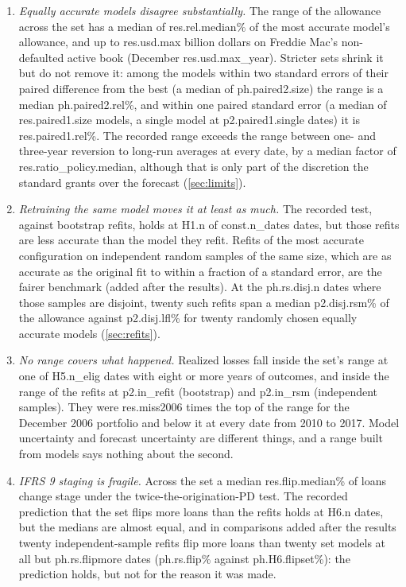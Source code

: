 \begin{enumerate}[leftmargin=*, itemsep=2pt]
\item \emph{Equally accurate models disagree substantially.} The range of the
allowance across the set has a median of \num{res.rel.median}\% of the most
accurate model's allowance, and up to \num{res.usd.max} billion dollars on
Freddie Mac's non-defaulted active book (December \num{res.usd.max_year}).
Stricter sets shrink it but do not remove it: among the models within two
standard errors of their paired difference from the best (a median of
\num{ph.paired2.size}) the range is a median \num{ph.paired2.rel}\%, and within
one paired standard error (a median of \num{res.paired1.size} models, a single
model at \num{p2.paired1.single} dates) it is \num{res.paired1.rel}\%. The
recorded range exceeds the range between one- and three-year reversion to
long-run averages at every date, by a median factor of
\num{res.ratio_policy.median}, although that is only part of the discretion
the standard grants over the forecast (\cref{sec:limits}).
\item \emph{Retraining the same model moves it at least as much.} The recorded
test, against bootstrap refits, holds at \num{H1.n} of \num{const.n_dates}
dates, but those refits are less accurate than the model they refit. Refits of
the most accurate configuration on independent random samples of the same
size, which are as accurate as the original fit to within a fraction of a
standard error, are the fairer benchmark (added after the results). At the
\num{ph.rs.disj.n} dates where those samples are disjoint, twenty such refits
span a median \num{p2.disj.rsm}\% of the allowance against \num{p2.disj.lfl}\%
for twenty randomly chosen equally accurate models (\cref{sec:refits}).
\item \emph{No range covers what happened.} Realized losses fall inside
the set's range at one of \num{H5.n_elig} dates with eight or more years of
outcomes, and inside the range of the refits at \num{p2.in_refit} (bootstrap)
and \num{p2.in_rsm} (independent samples). They were \num{res.miss2006} times the top of the range for the
December 2006 portfolio and below it at every date from 2010 to 2017. Model uncertainty and
forecast uncertainty are different things, and a range built from models says
nothing about the second.
\item \emph{IFRS 9 staging is fragile.} Across the set a median
\num{res.flip.median}\% of loans change stage under the twice-the-origination-PD
test. The recorded prediction that the set flips more loans than the refits
holds at \num{H6.n} dates, but the medians are almost equal, and in comparisons
added after the results twenty independent-sample refits flip more loans than
twenty set models at all but \num{ph.rs.flipmore} dates (\num{ph.rs.flip}\%
against \num{ph.H6.flipset}\%): the prediction holds, but not for the reason it
was made.
\end{enumerate}

